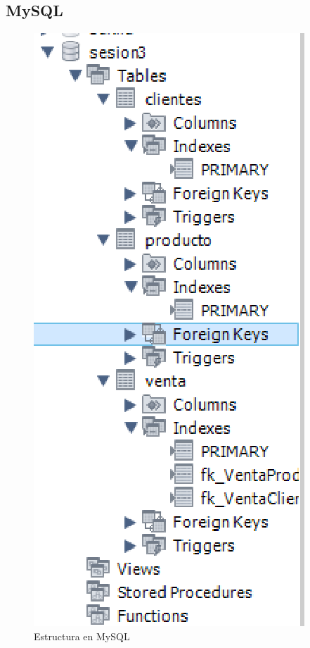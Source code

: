 \documentclass[a4paper,12pt]{article}
\begin{document}
\break

\subsection{MySQL}

\begin{figure}[h]
\centering
\includegraphics[scale=0.5]{3.eps}
\caption{Estructura en MySQL}
\end{figure}
\end{document}
